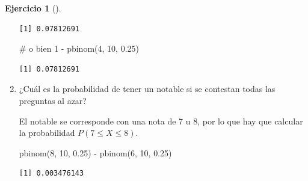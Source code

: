 \documentclass[
  a4paper,
]{scrreport}
\newenvironment{Shaded}{\begin{snugshade}}{\end{snugshade}}
\newcommand{\CommentTok}[1]{\textcolor[rgb]{0.37,0.37,0.37}{#1}}
\newcommand{\DecValTok}[1]{\textcolor[rgb]{0.68,0.00,0.00}{#1}}
\newcommand{\FloatTok}[1]{\textcolor[rgb]{0.68,0.00,0.00}{#1}}
\newcommand{\FunctionTok}[1]{\textcolor[rgb]{0.28,0.35,0.67}{#1}}
\newcommand{\NormalTok}[1]{\textcolor[rgb]{0.00,0.23,0.31}{#1}}
\newcommand{\SpecialCharTok}[1]{\textcolor[rgb]{0.37,0.37,0.37}{#1}}
\theoremstyle{definition}
\newtheorem{exercise}{Ejercicio}[chapter]
\theoremstyle{remark}
\begin{document}
\begin{exercise}[]
\begin{enumerate}
\begin{tcolorbox}
\begin{verbatim}
[1] 0.07812691
\end{verbatim}

\begin{Shaded}
\begin{Highlighting}[]
\CommentTok{\# o bien}
\DecValTok{1} \SpecialCharTok{{-}} \FunctionTok{pbinom}\NormalTok{(}\DecValTok{4}\NormalTok{, }\DecValTok{10}\NormalTok{, }\FloatTok{0.25}\NormalTok{)}
\end{Highlighting}
\end{Shaded}

\begin{verbatim}
[1] 0.07812691
\end{verbatim}

  \end{tcolorbox}
\item
  ¿Cuál es la probabilidad de tener un notable si se contestan todas las
  preguntas al azar?

  \begin{tcolorbox}[enhanced jigsaw, toprule=.15mm, rightrule=.15mm, arc=.35mm, colback=white, colbacktitle=quarto-callout-tip-color!10!white, toptitle=1mm, left=2mm, colframe=quarto-callout-tip-color-frame, opacityback=0, breakable, opacitybacktitle=0.6, bottomtitle=1mm, titlerule=0mm, title=\textcolor{quarto-callout-tip-color}{\faLightbulb}\hspace{0.5em}{Solución}, bottomrule=.15mm, coltitle=black, leftrule=.75mm]

  El notable se corresponde con una nota de 7 u 8, por lo que hay que
  calcular la probabilidad \(P(7\leq X\leq 8)\).

\begin{Shaded}
\begin{Highlighting}[]
\FunctionTok{pbinom}\NormalTok{(}\DecValTok{8}\NormalTok{, }\DecValTok{10}\NormalTok{, }\FloatTok{0.25}\NormalTok{) }\SpecialCharTok{{-}} \FunctionTok{pbinom}\NormalTok{(}\DecValTok{6}\NormalTok{, }\DecValTok{10}\NormalTok{, }\FloatTok{0.25}\NormalTok{)}
\end{Highlighting}
\end{Shaded}

\begin{verbatim}
[1] 0.003476143
\end{verbatim}

  \end{tcolorbox}
\end{enumerate}

\end{exercise}
\end{document}
